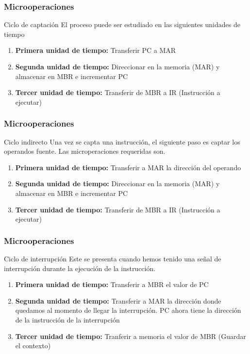 \documentclass{beamer}
\begin{document}
\begin{frame}
	\frametitle{Microoperaciones}
	\begin{block}{Ciclo de captación}
	El proceso puede ser estudiado en las siguientes unidades de tiempo
	\begin{enumerate}
		\item \textbf{Primera unidad de tiempo:} Transferir PC a MAR
		\item \textbf{Segunda unidad de tiempo:} Direccionar en la memoria (MAR) y almacenar en MBR e incrementar PC
		\item \textbf{Tercer unidad de tiempo:} Transferir de MBR a IR (Instrucción a ejecutar)
	\end{enumerate}	 
	\end{block}
\end{frame}


\begin{frame}
	\frametitle{Microoperaciones}
	\begin{block}{Ciclo indirecto}
	Una vez se capta una instrucción, el siguiente paso es captar los operandos fuente. Las microperaciones requeridas son.
	\begin{enumerate}
		\item \textbf{Primera unidad de tiempo:} Transferir a MAR la dirección del operando
		\item \textbf{Segunda unidad de tiempo:} Direccionar en la memoria (MAR) y almacenar en MBR e incrementar PC
		\item \textbf{Tercer unidad de tiempo:} Transferir de MBR a IR (Instrucción a ejecutar)
	\end{enumerate}	 
	\end{block}
\end{frame}

\begin{frame}
	\frametitle{Microoperaciones}
	\begin{block}{Ciclo de interrupción}
	Este se presenta cuando hemos tenido una señal de interrupción durante la ejecución de la instrucción.
	\begin{enumerate}
		\item \textbf{Primera unidad de tiempo:} Transferir a MBR el valor de PC
		\item \textbf{Segunda unidad de tiempo:} Transferir a MAR la dirección donde quedamos al momento de llegar la interrupción. PC ahora tiene la dirección de la instrucción de la interrupción
		\item \textbf{Tercer unidad de tiempo:} Tranferir a memoria el valor de MBR (Guardar el contexto)	
	\end{enumerate}	 
	\end{block}
\end{frame}
\end{document}
